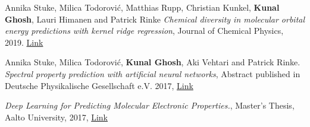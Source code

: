 \documentclass[]{deedy-resume}
\begin{document}
\begin{minipage}[t]{0.62\textwidth}
{\textbullet{} Annika Stuke, Milica Todorovi{\'{c}}, Matthias Rupp, Christian Kunkel, \textbf{Kunal Ghosh}, Lauri Himanen and Patrick Rinke  \textit{Chemical diversity in molecular orbital energy predictions with kernel ridge regression}, Journal of Chemical Physics, 2019. \href{https://aip.scitation.org/doi/10.1063/1.5086105}{Link}
\sectionsep

\textbullet{} Annika Stuke, Milica Todorovi\'c, \textbf{Kunal Ghosh}, Aki Vehtari and Patrick Rinke. \textit{Spectral property prediction with artificial neural networks}, Abstract published in Deutsche Physikalische Gesellschaft e.V. 2017, \href{http://www.dpg-verhandlungen.de/year/2017/conference/dresden/part/o/session/9A9/contribution/6?lang=en}{Link} 
\sectionsep

\textbullet{} \textit{Deep Learning for Predicting Molecular Electronic Properties.}, Master's Thesis, Aalto University, 2017, \href{http://urn.fi/URN:NBN:fi:aalto-201710307417}{Link}
}


	



\end{minipage}
\end{document}
